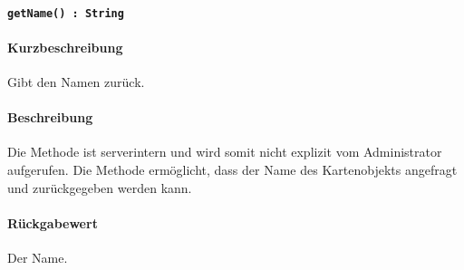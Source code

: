 \paragraph{\texttt{getName() : String}}%
\paragraph*{Kurzbeschreibung}
Gibt den Namen zurück.
\paragraph*{Beschreibung}
Die Methode ist serverintern und wird somit nicht explizit vom Administrator aufgerufen.
Die Methode ermöglicht, dass der Name des Kartenobjekts angefragt und zurückgegeben werden kann.
\paragraph*{Rückgabewert}
Der Name.
